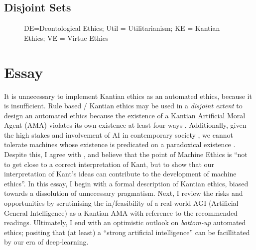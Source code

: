 \documentclass{scrartcl}
\begin{document}
\subsection{Disjoint Sets}
\begin{figure}[ht]
  \centering

\caption{\scriptsize DE=Deontological Ethics; Util = Utilitarianism; KE = Kantian Ethics; VE = Virtue Ethics}
\label{fig:space}
\end{figure}

\newpage
\section{Essay}
\doublespacing
It is unnecessary to implement Kantian ethics as an automated ethics, because it is insufficient. Rule based / Kantian ethics may be used in a \emph{disjoint extent} to design an automated ethics because the existence of a Kantian Artificial Moral Agent (AMA) violates its own existence at least four ways \parencite{Tonkens2009}. Additionally, given the high stakes and involvement of AI in contemporary society \parencite{Fjeld2020}, we cannot tolerate machines whose existence is predicated on a paradoxical existence \parencite{EC_HLEG_AI}. Despite this, I agree with \cite{BentzenLindner2018}, and believe that the point of Machine Ethics is \enquote{not to get close to a correct interpretation of Kant, but to show that our interpretation of Kant's ideas can contribute to the development of machine ethics}. In this essay, I begin with a formal description of Kantian ethics, biased towards a dissolution of unnecessary pragmatism. Next, I review the risks and opportunities by scrutinising the in/feasibility of a real-world AGI (Artificial General Intelligence) as a Kantian AMA with reference to the recommended readings. Ultimately, I end with an optimistic outlook on \emph{bottom-up} automated ethics; positing that (at least) a \enquote{strong artificial intelligence}\parencite{searle1996} can be facillitated by our era of deep-learning.
\end{document}
